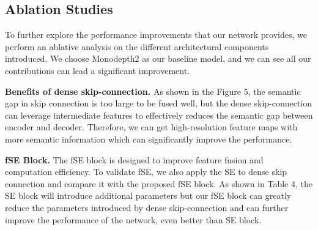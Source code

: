 \documentclass[letterpaper]{article} \usepackage{aaai21}  \usepackage{times}  \usepackage{helvet} \usepackage{courier}  \usepackage[hyphens]{url}  \usepackage{graphicx} \urlstyle{rm} \def\UrlFont{\rm}  \usepackage{natbib}  \usepackage{caption} \frenchspacing  \setlength{\pdfpagewidth}{8.5in}  \setlength{\pdfpageheight}{11in}  \usepackage{booktabs}
\begin{document}
\subsection{Ablation Studies}
To further explore the performance improvements that our network provides, we perform an ablative analysis on the different architectural components introduced. We choose Monodepth2 as our baseline model, and we can see 
all our contributions can lead a significant improvement. 

\noindent\textbf{Benefits of dense skip-connection.} As shown in the Figure 5, the semantic gap in skip connection is too large to be fused well, but the dense skip-connection can leverage intermediate features to 
effectively reduces the semantic gap between encoder and decoder. Therefore, we can get high-resolution feature maps with more semantic information which can significantly improve the performance. 

\noindent\textbf{fSE Block.} The fSE block is designed to improve feature fusion and computation efficiency. To validate fSE, we also apply the SE\cite{hu2019squeeze-and-excitation} to dense skip connection and 
compare it with the proposed fSE block. As shown in Table 4, the SE block will introduce additional parameters but our fSE block can greatly reduce the
parameters introduced by dense skip-connection and can further improve the performance of the network, even better than SE block.

\begin{table}[!ht]
    \caption{\textbf{Ablation Studies.} Results for different variants of our model with monocular training on KITTI at low resolution on Eigen split. The baseline model is Monodepth2. We introduce the dense skip-connection(dense SC)
    to original structure and compare effect of SE block and fSE block.}
    \label{tab:4}
\end{table}
\end{document}
